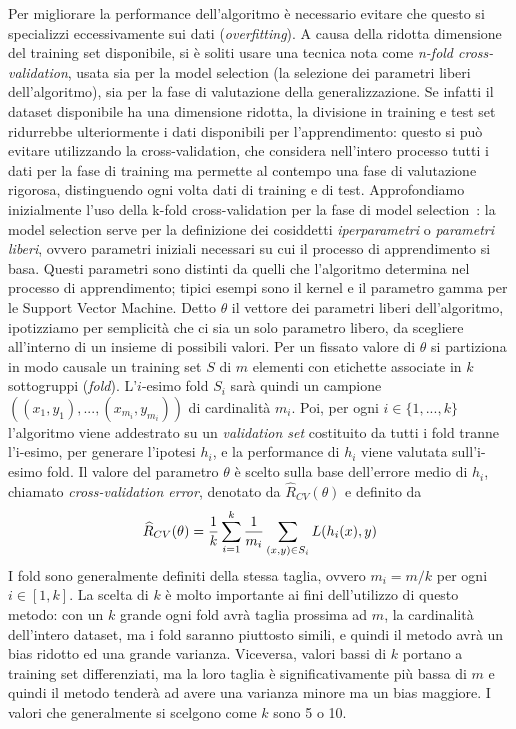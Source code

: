 \documentclass[oneside, openany]{book}
\begin{document}
		Per migliorare la performance dell'algoritmo è necessario evitare che questo si specializzi eccessivamente sui dati (\textit{overfitting}). A causa della ridotta dimensione del training set disponibile, si è soliti usare una tecnica nota come \textit{n-fold cross-validation}, usata sia per la model selection (la selezione dei parametri liberi dell'algoritmo), sia per la fase di valutazione della generalizzazione. Se infatti il dataset disponibile ha una dimensione ridotta, la divisione in training e test set ridurrebbe ulteriormente i dati disponibili per l'apprendimento: questo si può evitare utilizzando la cross-validation, che considera nell'intero processo tutti i dati per la fase di training ma permette al contempo una fase di valutazione rigorosa, distinguendo ogni volta dati di training e di test.\newline
		Approfondiamo inizialmente l'uso della k-fold cross-validation per la fase di model selection~\cite{bib:cv}: la model selection serve per la definizione dei cosiddetti \textit{iperparametri} o \textit{parametri liberi}, ovvero parametri iniziali necessari su cui il processo di apprendimento si basa. Questi parametri sono distinti da quelli che l'algoritmo determina nel processo di apprendimento; tipici esempi sono il kernel e il parametro gamma per le Support Vector Machine.\newline
		Detto $\theta$ il vettore dei parametri liberi dell'algoritmo, ipotizziamo per semplicità che ci sia un solo parametro libero, da scegliere all'interno di un insieme di possibili valori. Per un fissato valore di $\theta$ si partiziona in modo causale un training set $S$ di $m$ elementi con etichette associate in $k$ sottogruppi (\textit{fold}). L'$i$-esimo fold $S_i$ sarà quindi un campione $((x_{1}, y_{1}),...,(x_{m_i},y_{m_i}))$ di cardinalità $m_i$. Poi, per ogni $i\in\{1, ..., k\}$ l'algoritmo viene addestrato su un \textit{validation set} costituito da tutti i fold tranne l'i-esimo, per generare l'ipotesi $h_i$, e la performance di $h_i$ viene valutata sull'i-esimo fold. Il valore del parametro $\theta$ è scelto sulla base dell'errore medio di $h_i$, chiamato \textit{cross-validation error}, denotato da $\widehat{R}_{CV}(\theta)$ e definito da
		\[
		\widehat{R}_{CV}(\theta)={1\over k}\sum_{i=1}^k {1\over m_i}\sum_{(x,y)\in S_i} L(h_i(x),y)
		\]
		I fold sono generalmente definiti della stessa taglia, ovvero $m_i=m/k$ per ogni $i\in[1,k]$. La scelta di $k$ è molto importante ai fini dell'utilizzo di questo metodo: con un $k$ grande ogni fold avrà taglia prossima ad $m$, la cardinalità dell'intero dataset, ma i fold saranno piuttosto simili, e quindi il metodo avrà un bias ridotto ed una grande varianza. Viceversa, valori bassi di $k$ portano a training set differenziati, ma la loro taglia è significativamente più bassa di $m$ e quindi il metodo tenderà ad avere una varianza minore ma un bias maggiore. I valori che generalmente si scelgono come $k$ sono 5 o 10.\newline
\end{document}
